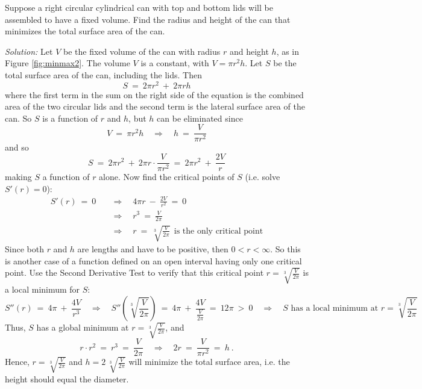 \begin{exmp}\label{exmp:minmax2}
 \piccaption[]{\label{fig:minmax2}}
\noindent Suppose a right circular cylindrical can with top and bottom lids will
be assembled to have a fixed volume. Find the radius and height of the
can that minimizes the total surface area of the can.\vspace{1mm}
\par\noindent\emph{Solution:} Let $V$ be the fixed volume of the can with radius
$r$ and height $h$, as in Figure \ref{fig:minmax2}. The volume $V$ is a
constant, with $V = \pi r^2h$. Let $S$ be the total surface area of the can,
including the lids. Then
\[
S ~=~ 2\pi r^2 ~+~ 2\pi rh
\]
where the first term in the sum on the right side of the equation is the
combined area of the two circular lids and the second term is the lateral
surface area of the can. So $S$ is a function of $r$ and $h$, but $h$ can be
eliminated since
\[
V ~=~ \pi r^2h \quad\Rightarrow\quad h ~=~ \frac{V}{\pi r^2}
\]
and so
\[
S ~=~ 2\pi r^2 ~+~ 2\pi r \cdot \frac{V}{\pi r^2} ~=~ 2\pi r^2 ~+~ \frac{2V}{r}
\]
making $S$ a function of $r$ alone. Now find the critical points of $S$ (i.e.
solve $S'(r)=0$):
\begin{align*}
S'(r) ~=~ 0 \quad&\Rightarrow\quad 4\pi r ~-~ \frac{2V}{r^2} ~=~ 0\\
&\Rightarrow\quad r^3 ~=~ \frac{V}{2\pi}\\
&\Rightarrow\quad r ~=~ \sqrt[3]{\frac{V}{2\pi}} ~~\text{is the only critical point}
\end{align*}
Since both $r$ and $h$ are lengths and have to be positive, then
$0 < r < \infty$. So this is another case of a function defined on an open
interval having only one critical point. Use the Second Derivative Test to
verify that this critical point $r=\sqrt[3]{\frac{V}{2\pi}}$ is a local minimum
for $S$:
\[
S''(r) ~=~ 4\pi ~+~ \frac{4V}{r^3} \quad\Rightarrow\quad
S''\left(\sqrt[3]{\frac{V}{2\pi}}\right) ~=~ 4\pi ~+~ \frac{4V}{\frac{V}{2\pi}}
 ~=~ 12\pi ~>~ 0
\quad\Rightarrow\quad\text{$S$ has a local minimum at $r = \sqrt[3]{\frac{V}{2\pi}}$}
\]
Thus, $S$ has a global minimum at $r = \sqrt[3]{\frac{V}{2\pi}}$, and
\[
r \cdot r^2 ~=~ r^3 ~=~ \frac{V}{2\pi} \quad\Rightarrow\quad
2r ~=~ \frac{V}{\pi r^2} ~=~ h ~.
\]
Hence, $r = \sqrt[3]{\frac{V}{2\pi}}$ and $h = 2\,\sqrt[3]{\frac{V}{2\pi}}$ will
minimize the total surface area, i.e. the height should equal the diameter.\vspace{2mm}


\end{exmp}
